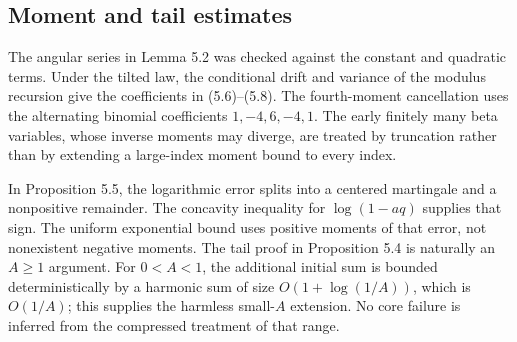 \documentclass[10pt]{article}
\begin{document}
\subsection*{Moment and tail estimates}
The angular series in Lemma 5.2 was checked against the constant and quadratic terms. Under the tilted law, the conditional drift and variance of the modulus recursion give the coefficients in (5.6)–(5.8). The fourth-moment cancellation uses the alternating binomial coefficients \(1,-4,6,-4,1\). The early finitely many beta variables, whose inverse moments may diverge, are treated by truncation rather than by extending a large-index moment bound to every index.\par
In Proposition 5.5, the logarithmic error splits into a centered martingale and a nonpositive remainder. The concavity inequality for \(\log(1-aq)\) supplies that sign. The uniform exponential bound uses positive moments of that error, not nonexistent negative moments. The tail proof in Proposition 5.4 is naturally an \(A\ge1\) argument. For \(0<A<1\), the additional initial sum is bounded deterministically by a harmonic sum of size \(O(1+\log(1/A))\), which is \(O(1/A)\); this supplies the harmless small-\(A\) extension. No core failure is inferred from the compressed treatment of that range.\par
\end{document}
